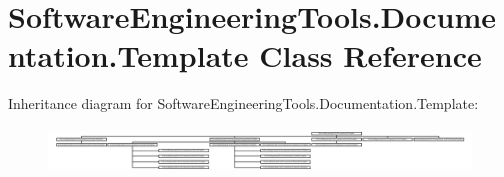 \hypertarget{class_software_engineering_tools_1_1_documentation_1_1_template}{\section{Software\+Engineering\+Tools.\+Documentation.\+Template Class Reference}
\label{class_software_engineering_tools_1_1_documentation_1_1_template}
}
Inheritance diagram for Software\+Engineering\+Tools.\+Documentation.\+Template\+:\begin{figure}[H]
\begin{center}
\leavevmode
\includegraphics[height=1.203931cm]{class_software_engineering_tools_1_1_documentation_1_1_template}
\end{center}
\end{figure}
